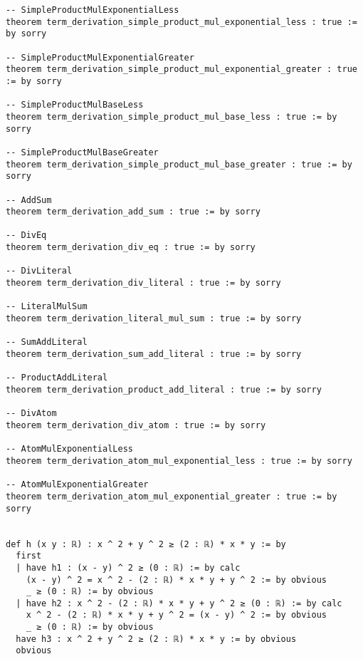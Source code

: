 \documentclass{article}
\begin{document}
\begin{tcolorbox}[colback=white!10, width=\linewidth]
\begin{lstlisting}[language=Lean4]
-- SimpleProductMulExponentialLess
theorem term_derivation_simple_product_mul_exponential_less : true := by sorry

-- SimpleProductMulExponentialGreater
theorem term_derivation_simple_product_mul_exponential_greater : true := by sorry

-- SimpleProductMulBaseLess
theorem term_derivation_simple_product_mul_base_less : true := by sorry

-- SimpleProductMulBaseGreater
theorem term_derivation_simple_product_mul_base_greater : true := by sorry

-- AddSum
theorem term_derivation_add_sum : true := by sorry

-- DivEq
theorem term_derivation_div_eq : true := by sorry

-- DivLiteral
theorem term_derivation_div_literal : true := by sorry

-- LiteralMulSum
theorem term_derivation_literal_mul_sum : true := by sorry

-- SumAddLiteral
theorem term_derivation_sum_add_literal : true := by sorry

-- ProductAddLiteral
theorem term_derivation_product_add_literal : true := by sorry

-- DivAtom
theorem term_derivation_div_atom : true := by sorry

-- AtomMulExponentialLess
theorem term_derivation_atom_mul_exponential_less : true := by sorry

-- AtomMulExponentialGreater
theorem term_derivation_atom_mul_exponential_greater : true := by sorry


def h (x y : ℝ) : x ^ 2 + y ^ 2 ≥ (2 : ℝ) * x * y := by
  first
  | have h1 : (x - y) ^ 2 ≥ (0 : ℝ) := by calc
    (x - y) ^ 2 = x ^ 2 - (2 : ℝ) * x * y + y ^ 2 := by obvious
    _ ≥ (0 : ℝ) := by obvious
  | have h2 : x ^ 2 - (2 : ℝ) * x * y + y ^ 2 ≥ (0 : ℝ) := by calc
    x ^ 2 - (2 : ℝ) * x * y + y ^ 2 = (x - y) ^ 2 := by obvious
    _ ≥ (0 : ℝ) := by obvious
  have h3 : x ^ 2 + y ^ 2 ≥ (2 : ℝ) * x * y := by obvious
  obvious

\end{lstlisting}
\end{tcolorbox}
\end{document}
